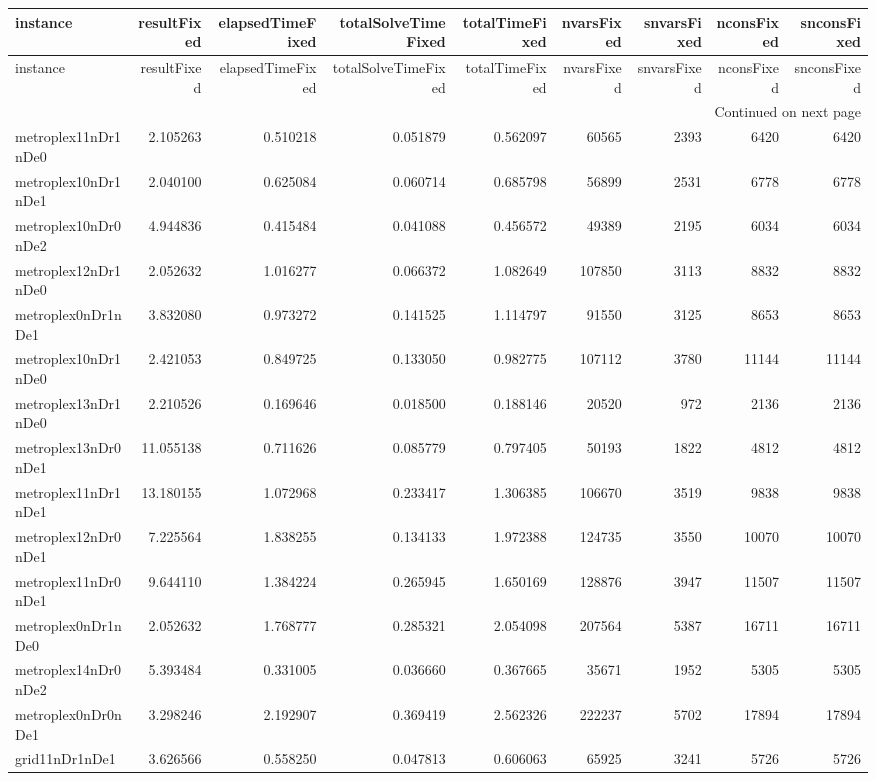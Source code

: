 
\begin{longtable}{|l|r|r|r|r|r|r|r|r|}
\toprule
instance & resultFixed & elapsedTimeFixed & totalSolveTimeFixed & totalTimeFixed & nvarsFixed & snvarsFixed & nconsFixed & snconsFixed \\
\midrule
\endfirsthead
\toprule
instance & resultFixed & elapsedTimeFixed & totalSolveTimeFixed & totalTimeFixed & nvarsFixed & snvarsFixed & nconsFixed & snconsFixed \\
\midrule
\endhead
\midrule
\multicolumn{9}{r}{Continued on next page} \\
\midrule
\endfoot
\bottomrule
\endlastfoot
metroplex11nDr1nDe0 & 2.105263 & 0.510218 & 0.051879 & 0.562097 & 60565 & 2393 & 6420 & 6420 \\
metroplex10nDr1nDe1 & 2.040100 & 0.625084 & 0.060714 & 0.685798 & 56899 & 2531 & 6778 & 6778 \\
metroplex10nDr0nDe2 & 4.944836 & 0.415484 & 0.041088 & 0.456572 & 49389 & 2195 & 6034 & 6034 \\
metroplex12nDr1nDe0 & 2.052632 & 1.016277 & 0.066372 & 1.082649 & 107850 & 3113 & 8832 & 8832 \\
metroplex0nDr1nDe1 & 3.832080 & 0.973272 & 0.141525 & 1.114797 & 91550 & 3125 & 8653 & 8653 \\
metroplex10nDr1nDe0 & 2.421053 & 0.849725 & 0.133050 & 0.982775 & 107112 & 3780 & 11144 & 11144 \\
metroplex13nDr1nDe0 & 2.210526 & 0.169646 & 0.018500 & 0.188146 & 20520 & 972 & 2136 & 2136 \\
metroplex13nDr0nDe1 & 11.055138 & 0.711626 & 0.085779 & 0.797405 & 50193 & 1822 & 4812 & 4812 \\
metroplex11nDr1nDe1 & 13.180155 & 1.072968 & 0.233417 & 1.306385 & 106670 & 3519 & 9838 & 9838 \\
metroplex12nDr0nDe1 & 7.225564 & 1.838255 & 0.134133 & 1.972388 & 124735 & 3550 & 10070 & 10070 \\
metroplex11nDr0nDe1 & 9.644110 & 1.384224 & 0.265945 & 1.650169 & 128876 & 3947 & 11507 & 11507 \\
metroplex0nDr1nDe0 & 2.052632 & 1.768777 & 0.285321 & 2.054098 & 207564 & 5387 & 16711 & 16711 \\
metroplex14nDr0nDe2 & 5.393484 & 0.331005 & 0.036660 & 0.367665 & 35671 & 1952 & 5305 & 5305 \\
metroplex0nDr0nDe1 & 3.298246 & 2.192907 & 0.369419 & 2.562326 & 222237 & 5702 & 17894 & 17894 \\
grid11nDr1nDe1 & 3.626566 & 0.558250 & 0.047813 & 0.606063 & 65925 & 3241 & 5726 & 5726 \\

\end{longtable}
